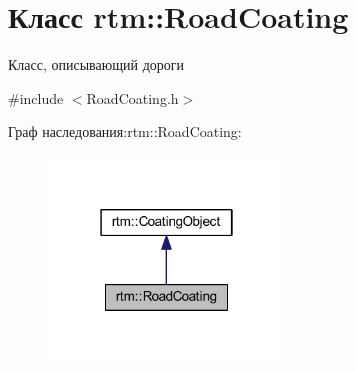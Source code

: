 \hypertarget{classrtm_1_1_road_coating}{}\section{Класс rtm\+:\+:Road\+Coating}
\label{classrtm_1_1_road_coating}


Класс, описывающий дороги  




{\ttfamily \#include $<$Road\+Coating.\+h$>$}



Граф наследования\+:rtm\+:\+:Road\+Coating\+:
\nopagebreak
\begin{figure}[H]
\begin{center}
\leavevmode
\includegraphics[width=178pt]{classrtm_1_1_road_coating__inherit__graph}
\end{center}
\end{figure}
